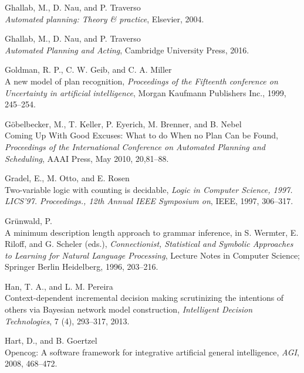 \documentclass[11pt,a4paper,twoside,openright,titlepage,numbers=noenddot,headinclude,cleardoublepage=empty,openany]{scrreprt}
\theoremstyle{plain}
\theoremstyle{definition}
\theoremstyle{remark}
\begin{document}
\leavevmode\hypertarget{ref-ghallab_automated_2004}{}%
Ghallab, M., D. Nau, and P. Traverso\\
\emph{Automated planning: Theory \& practice}, Elsevier, 2004.

\leavevmode\hypertarget{ref-ghallab_automated_2016}{}%
Ghallab, M., D. Nau, and P. Traverso\\
\emph{Automated Planning and Acting}, Cambridge University Press, 2016.

\leavevmode\hypertarget{ref-goldman_new_1999}{}%
Goldman, R. P., C. W. Geib, and C. A. Miller\\
A new model of plan recognition, \emph{Proceedings of the Fifteenth
conference on Uncertainty in artificial intelligence}, Morgan Kaufmann
Publishers Inc., 1999, 245--254.

\leavevmode\hypertarget{ref-gobelbecker_coming_2010}{}%
Göbelbecker, M., T. Keller, P. Eyerich, M. Brenner, and B. Nebel\\
Coming Up With Good Excuses: What to do When no Plan Can be Found,
\emph{Proceedings of the International Conference on Automated Planning
and Scheduling}, AAAI Press, May 2010, 20,81--88.

\leavevmode\hypertarget{ref-gradel_twovariable_1997}{}%
Gradel, E., M. Otto, and E. Rosen\\
Two-variable logic with counting is decidable, \emph{Logic in Computer
Science, 1997. LICS'97. Proceedings., 12th Annual IEEE Symposium on},
IEEE, 1997, 306--317.

\leavevmode\hypertarget{ref-grunwald_minimum_1996}{}%
Grünwald, P.\\
A minimum description length approach to grammar inference, in S.
Wermter, E. Riloff, and G. Scheler (eds.), \emph{Connectionist,
Statistical and Symbolic Approaches to Learning for Natural Language
Processing}, Lecture Notes in Computer Science; Springer Berlin
Heidelberg, 1996, 203--216.

\leavevmode\hypertarget{ref-han_contextdependent_2013}{}%
Han, T. A., and L. M. Pereira\\
Context-dependent incremental decision making scrutinizing the
intentions of others via Bayesian network model construction,
\emph{Intelligent Decision Technologies}, 7 (4), 293--317, 2013.

\leavevmode\hypertarget{ref-hart_opencog_2008}{}%
Hart, D., and B. Goertzel\\
Opencog: A software framework for integrative artificial general
intelligence, \emph{AGI}, 2008, 468--472.
\end{document}
